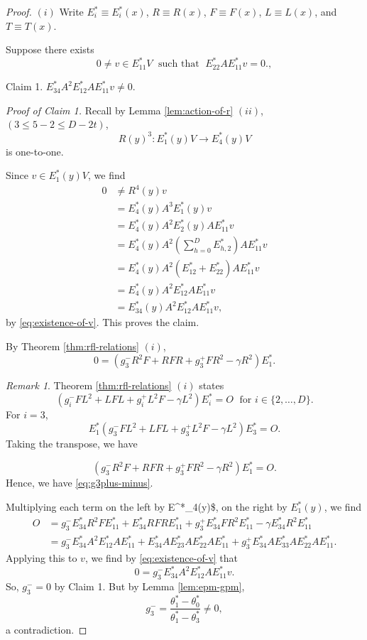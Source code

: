 \documentclass[
]{book}
\theoremstyle{definition}
\theoremstyle{definition}
\theoremstyle{definition}
\theoremstyle{definition}
\theoremstyle{remark}
\newtheorem*{remark}{Remark}
\begin{document}
\begin{proof}
\leavevmode

\((i)\) Write \(E^*_i\equiv E^*_i(x)\), \(R \equiv R(x)\), \(F \equiv F(x)\), \(L \equiv L(x)\), and \(T \equiv T(x)\).

Suppose there exists
\begin{equation}
0\neq v\in E^*_{11}V \; \text{ such that }\; E^*_{22}AE^*_{11}v = 0. \label{eq:existence-of-v},
\end{equation}

Claim 1. \(E^*_{34}A^2E^*_{12}AE^*_{11}v \neq 0\).

\emph{Proof of Claim 1.}
Recall by Lemma \ref{lem:action-of-r} \((ii)\), \((3 \leq 5-2 \leq D-2t)\),
\[R(y)^3: E^*_1(y)V \to E^*_4(y)V\]
is one-to-one.

Since \(v\in E^*_1(y)V\), we find
\begin{align}
0 & \neq R^4(y)v\\
& = E^*_4(y)A^3E^*_1(y)v\\
& = E^*_4(y)A^2E^*_2(y)AE^*_{11}v\\
& = E^*_4(y)A^2\left(\sum_{h=0}^D E^*_{h,2}\right)AE^*_{11}v\\
& = E^*_4(y)A^2(E^*_{12} + E^*_{22})AE^*_{11}v\\
& = E^*_4(y)A^2E^*_{12}AE^*_{11}v \\
& = E^*_{34}(y)A^2E^*_{12}AE^*_{11}v,
\end{align}
by \eqref{eq:existence-of-v}.
This proves the claim.

By Theorem \ref{thm:rfl-relations} \((i)\),
\begin{equation}
0 = (g_3^-R^2F + RFR + g^+_3FR^2 - \gamma R^2)E^*_1.  \label{eq:g3plus-minus}
\end{equation}

\begin{remark}
Theorem \ref{thm:rfl-relations} \((i)\) states
\[(g_i^-FL^2 + LFL + g^+_iL^2F - \gamma L^2)E^*_i = O \;\text{ for }i\in \{2, \ldots, D\}.\]
For \(i = 3\),
\[E^*_1(g^-_3 FL^2 + LFL + g^+_3 L^2F - \gamma L^2)E^*_3 = O.\]
Taking the transpose, we have

\[(g^{-}_3 R^2 F + RFR + g^{+}_3 FR^2 - \gamma R^2) E^*_1 = O.\]
Hence, we have \eqref{eq:g3plus-minus}.
\end{remark}

Multiplying each term on the left by E\^{}*\_4(y)\$, on the right by \(E^*_1(y)\), we find
\begin{align}
O & = g^-_3E^*_{34}R^2FE^*_{11} + E^*_{34}RFRE^*_{11} + g^+_3E^*_{34}FR^2E^*_{11}-\gamma E^*_{34}R^2E^*_{11}\\
& = g^-_3E^*_{34}A^2E^*_{12}AE^*_{11} + E^*_{34}AE^*_{23}AE^*_{22}AE^*_{11} + g^+_3E^*_{34}AE^*_{33}AE^*_{22}AE^*_{11}. \label{eq:g3plus-minus-zero}
\end{align}
Applying this to \(v\), we find by \eqref{eq:existence-of-v} that
\[0 = g^-_3E^*_{34}A^2E^*_{12}AE^*_{11}v.\]
So, \(g^-_3 = 0\) by Claim 1. But by Lemma \ref{lem:epm-gpm},
\[g^-_3 = \frac{\theta^*_1-\theta^*_0}{\theta^*_1-\theta^*_3} \neq 0,\]
a contradiction.

\end{proof}
\end{document}
